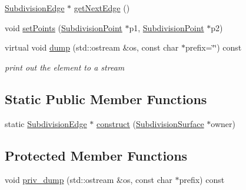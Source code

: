 \begin{DoxyCompactItemize}
\hyperlink{classShipCADGeometry_1_1SubdivisionEdge}{Subdivision\-Edge} $\ast$ \hyperlink{classShipCADGeometry_1_1SubdivisionEdge_aebb50514ff119a1484f7c7505a527a2b}{get\-Next\-Edge} ()
\item 
void \hyperlink{classShipCADGeometry_1_1SubdivisionEdge_affa2f4fab16979100d12f1823b26aa9c}{set\-Points} (\hyperlink{classShipCADGeometry_1_1SubdivisionPoint}{Subdivision\-Point} $\ast$p1, \hyperlink{classShipCADGeometry_1_1SubdivisionPoint}{Subdivision\-Point} $\ast$p2)
\item 
virtual void \hyperlink{classShipCADGeometry_1_1SubdivisionEdge_a14cc58877644ebd7b7ebffbdf8ef87f7}{dump} (std\-::ostream \&os, const char $\ast$prefix=\char`\"{}\char`\"{}) const 
\begin{DoxyCompactList}\small\item\em print out the element to a stream \end{DoxyCompactList}\end{DoxyCompactItemize}
\subsection*{Static Public Member Functions}
\begin{DoxyCompactItemize}
\item 
static \hyperlink{classShipCADGeometry_1_1SubdivisionEdge}{Subdivision\-Edge} $\ast$ \hyperlink{classShipCADGeometry_1_1SubdivisionEdge_ac2e94f4689d724a1d5b75c7f2619c37d}{construct} (\hyperlink{classShipCADGeometry_1_1SubdivisionSurface}{Subdivision\-Surface} $\ast$owner)
\end{DoxyCompactItemize}
\subsection*{Protected Member Functions}
\begin{DoxyCompactItemize}
\item 
void \hyperlink{classShipCADGeometry_1_1SubdivisionEdge_a8b33f4ae9edbd8ac4a386d9f5f5c1131}{priv\-\_\-dump} (std\-::ostream \&os, const char $\ast$prefix) const 
\end{DoxyCompactItemize}
